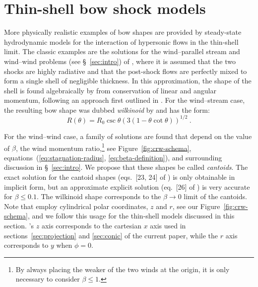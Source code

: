 \documentclass[useAMS, usenatbib, a4paper]{mnras}
\begin{document}



 

\newcommand\thC{\(\theta^1\)\,Ori~C}
\newcommand\CRW{\citetalias{Canto:1996}}


\section{Thin-shell bow shock models}
\label{sec:crw-scenario}

More physically realistic examples of bow shapes are provided by
steady-state hydrodynamic models for the interaction of hypersonic
flows in the thin-shell limit.  The classic examples are the solutions
for the wind--parallel stream and wind--wind problems (see
\S~\ref{sec:intro}) of \citet[][hereafter \CRW{}]{Canto:1996}, where
it is assumed that the two shocks are highly radiative and that the
post-shock flows are perfectly mixed to form a single shell of
negligible thickness. In this approximation, the shape of the shell is
found algebraically by \CRW{} from conservation of linear and angular
momentum, following an approach first outlined in
\citet{Wilkin:1996a}.  For the wind--stream case, the resulting bow
shape was dubbed \textit{wilkinoid} by \citet{Cox:2012a} and has the
form:
\begin{equation}
  \label{eq:wilkinoid-R-theta}
  R(\theta) = R_0\csc\theta\left( 3(1-\theta\cot\theta) \right)^{1/2} \ .
\end{equation}

For the wind--wind case, a family of solutions are found that depend on
the value of \(\beta\), the wind momentum ratio,\footnote{%
  By always placing the weaker of the two winds at the origin, it is
  only necessary to consider \(\beta \le 1\).  } %
see Figure~\ref{fig:crw-schema},
equations~(\ref{eq:stagnation-radius}, \ref{eq:beta-definition}), and
surrounding discussion in \S~\ref{sec:intro}.  We propose that these
shapes be called \textit{cantoids}.  The exact solution for the
cantoid shapes (eqs.~[23, 24] of \CRW{}) is only obtainable in
implicit form, but an approximate explicit solution (eq.~[26] of
\CRW{}) is very accurate for \(\beta \le 0.1\).  The wilkinoid shape
corresponds to the \(\beta \to 0\) limit of the cantoids.  Note that \CRW{}
employ cylindrical polar coordinates, \(z\) and \(r\), see our
Figure~\ref{fig:crw-schema}, and we follow this usage for the
thin-shell models discussed in this section.  \CRW{}'s \(z\) axis
corresponds to the cartesian \(x\) axis used in
sections~\ref{sec:projection} and \ref{sec:conic} of the current
paper, while the \(r\) axis corresponds to \(y\) when \(\phi = 0\).
\end{document}
